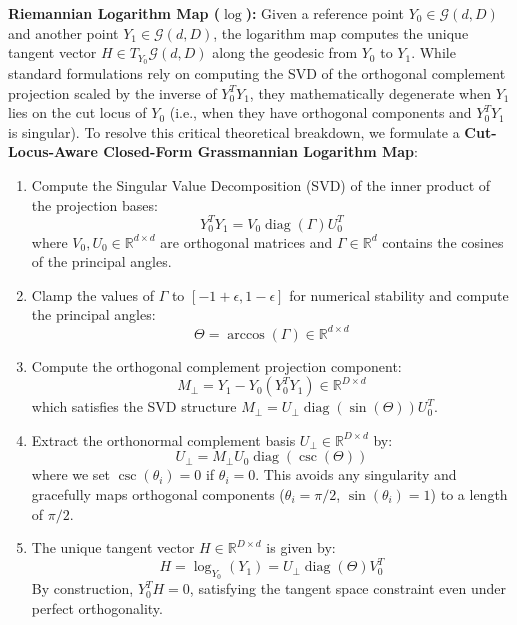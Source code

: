\textbf{Riemannian Logarithm Map ($\log$):} Given a reference point $Y_0 \in \mathcal{G}(d, D)$ and another point $Y_1 \in \mathcal{G}(d, D)$, the logarithm map computes the unique tangent vector $H \in T_{Y_0} \mathcal{G}(d, D)$ along the geodesic from $Y_0$ to $Y_1$. While standard formulations rely on computing the SVD of the orthogonal complement projection scaled by the inverse of $Y_0^T Y_1$, they mathematically degenerate when $Y_1$ lies on the cut locus of $Y_0$ (i.e., when they have orthogonal components and $Y_0^T Y_1$ is singular). To resolve this critical theoretical breakdown, we formulate a \textbf{Cut-Locus-Aware Closed-Form Grassmannian Logarithm Map}:
\begin{enumerate}
    \item Compute the Singular Value Decomposition (SVD) of the inner product of the projection bases:
    \begin{equation}
        Y_0^T Y_1 = V_0 \operatorname{diag}(\Gamma) U_0^T
    \end{equation}
    where $V_0, U_0 \in \mathbb{R}^{d \times d}$ are orthogonal matrices and $\Gamma \in \mathbb{R}^d$ contains the cosines of the principal angles.
    \item Clamp the values of $\Gamma$ to $[-1 + \epsilon, 1 - \epsilon]$ for numerical stability and compute the principal angles:
    \begin{equation}
        \Theta = \arccos(\Gamma) \in \mathbb{R}^{d \times d}
    \end{equation}
    \item Compute the orthogonal complement projection component:
    \begin{equation}
        M_{\perp} = Y_1 - Y_0 \left(Y_0^T Y_1\right) \in \mathbb{R}^{D \times d}
    \end{equation}
    which satisfies the SVD structure $M_{\perp} = U_{\perp} \operatorname{diag}(\sin(\Theta)) U_0^T$.
    \item Extract the orthonormal complement basis $U_{\perp} \in \mathbb{R}^{D \times d}$ by:
    \begin{equation}
        U_{\perp} = M_{\perp} U_0 \operatorname{diag}\left(\csc(\Theta)\right)
    \end{equation}
    where we set $\csc(\theta_i) = 0$ if $\theta_i = 0$. This avoids any singularity and gracefully maps orthogonal components ($\theta_i = \pi/2$, $\sin(\theta_i) = 1$) to a length of $\pi/2$.
    \item The unique tangent vector $H \in \mathbb{R}^{D \times d}$ is given by:
    \begin{equation}
        H = \log_{Y_0}(Y_1) = U_{\perp} \operatorname{diag}(\Theta) V_0^T
    \end{equation}
    By construction, $Y_0^T H = 0$, satisfying the tangent space constraint even under perfect orthogonality.
\end{enumerate}

